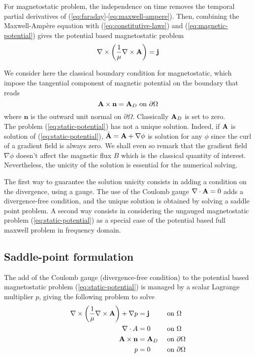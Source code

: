 For magnetostatic problem, the independence on time removes the temporal partial
derivatives of (\ref{eq:faraday}-\ref{eq:maxwell-ampere}). Then, combining the
Maxwell-Ampère equation with (\ref{eq:constitutive-laws}) and
(\ref{eq:magnetic-potential}) gives the potential based magnetostatic problem
\begin{equation}
  \label{eq:static-potential}
  \nabla \times \left( \frac{1}{\mu} \nabla \times \mathbf{A} \right) = \mathbf{j}
\end{equation}

We consider here the classical boundary condition for magnetostatic, which
impose the tangential component of magnetic potential on the boundary that reads
\begin{equation}
  \label{eq:boundary-cond}
  \mathbf{A} \times \mathbf{n} = \mathbf{A}_D ~\text{on} ~\partial \Omega
\end{equation}
where $\mathbf{n}$ is the outward unit normal on $\partial \Omega$.
Classically $\mathbf{A}_D$ is set to zero. \\

The problem (\ref{eq:static-potential}) has not a unique solution. Indeed, if
$\mathbf{A}$ is solution of (\ref{eq:static-potential}),
$\bar{\mathbf{A}} = \mathbf{A} + \nabla \phi$ is solution for any $\phi$ since the curl of a
gradient field is always zero. We shall even so remark that the gradient field
$\nabla \phi$ doesn't affect the magnetic flux $B$ which is the classical
quantity of interest. \\

Nevertheless, the unicity of the solution is essential for the numerical solving.

The first way to guarantee the solution unicity consists in adding a condition
on the divergence, using a gauge. The use of the Coulomb gauge
$\nabla\cdot\mathbf{A}=0$ adds a divergence-free condition, and the unique solution is
obtained by solving a saddle point problem. A second way consists in considering
the ungauged magnetostatic problem (\ref{eq:static-potential}) as a special case
of the potential based full maxwell problem in frequency domain.

\subsection{Saddle-point formulation}
\label{sec:saddle-mawxell}
The add of the Coulomb gauge (divergence-free condition) to the potential based
magnetostatic problem (\ref{eq:static-potential}) is managed by a scalar
Lagrange multiplier $p$, giving the following problem to solve
\begin{alignat}{2}
  \nabla \times \left( \frac{1}{\mu} \nabla \times \mathbf{A} \right) + \nabla p
  &= \mathbf{j} &&\text{ on } \Omega\\
  \nabla \cdot A &= 0 &&\text{ on } \Omega \\
  \mathbf{A} \times \mathbf{n} &= \mathbf{A}_D &&\text{ on } \partial \Omega \label{eq:saddle-bc} \\
  p &= 0 &&\text{ on } \partial \Omega
\end{alignat}

